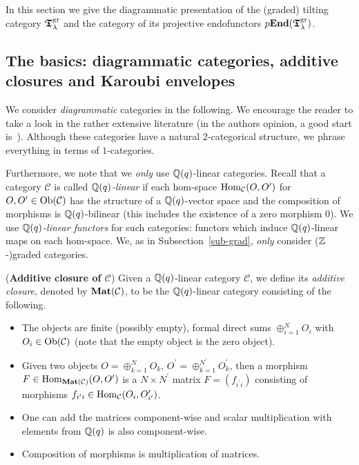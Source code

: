 In this section we give the diagrammatic presentation of 
the (graded) tilting category $\boldsymbol{\mathfrak{T}}_{\lambda}^{\mathrm{gr}}$ and the category of 
its projective endofunctors $p\boldsymbol{\mathrm{End}}(\boldsymbol{\mathfrak{T}}_{\lambda}^{\mathrm{gr}})$.




\subsection{The basics: diagrammatic categories, additive closures and Karoubi envelopes}\label{sub-basiccats}
We consider \textit{diagrammatic} categories 
in the following. We encourage the reader 
to take a look in the rather extensive literature 
(in the authors opinion, a good start is~\cite[Section 2]{lau1}).
Although these categories 
have a natural $2$-categorical structure, 
we phrase everything in terms of $1$-categories.



Furthermore, we note that we \textit{only} use 
$\mathbb{Q}(q)$-linear categories. Recall that a category 
$\mathcal C$ is called $\mathbb{Q}(q)$\textit{-linear} if each 
hom-space $\mathrm{Hom}_{\mathcal C}(O,O^{\prime})$ for 
$O,O^{\prime}\in\mathrm{Ob}(\mathcal C)$ has the 
structure of a $\mathbb{Q}(q)$-vector space and the composition of morphisms is $\mathbb{Q}(q)$-bilinear 
(this includes the existence of 
a zero morphism $0$). 
We use $\mathbb{Q}(q)$\textit{-linear functors} for such categories: 
functors which induce $\mathbb{Q}(q)$-linear maps on each hom-space. 
We, as in Subsection~\ref{sub-grad}, \textit{only} consider ($\mathbb{Z}$-)graded categories.









\begin{defnn}(\textbf{Additive closure of $\mathcal C$})\label{defn-addclosure} 
Given a $\mathbb{Q}(q)$-linear category $\mathcal C$, we define its \textit{additive closure}, 
denoted by $\boldsymbol{\mathrm{Mat}}(\mathcal C)$, to be the $\mathbb{Q}(q)$-linear category consisting of the following.
\begin{itemize}
\item The objects are finite (possibly empty), 
formal direct sums $\oplus_{i=1}^NO_i$ with $O_i\in\mathrm{Ob}(\mathcal C)$ 
(note that 
the empty object is the zero object).
\item Given two objects $O=\oplus_{k=1}^NO_k,\,O^{\prime}=\oplus_{k=1}^{N^{\prime}}O^{\prime}_k$, then a morphism $F\in\mathrm{Hom}_{\boldsymbol{\mathrm{Mat}}(\mathcal C)}(O,O^{\prime})$ is a $N\times N^{\prime}$ matrix $F=(f_{i^{\prime}i})$ consisting of morphisms $f_{i^{\prime}i}\in\mathrm{Hom}_{\mathcal C}(O_i,O^{\prime}_{i^{\prime}})$.
\item One can add the matrices component-wise and 
scalar multiplication with elements from $\mathbb{Q}(q)$ is also component-wise.
\item Composition of morphisms is multiplication 
of matrices.\maketriqed
\end{itemize}
\end{defnn}

